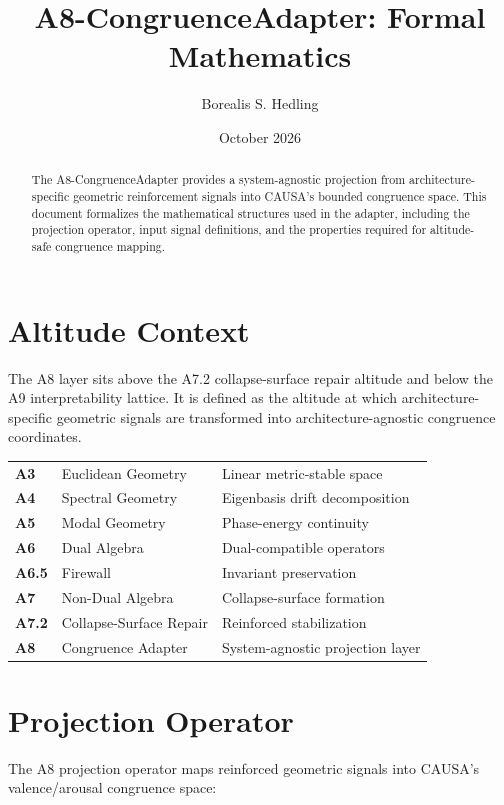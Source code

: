 \documentclass[11pt]{article}
\title{A8-CongruenceAdapter: Formal Mathematics}
\author{Borealis S. Hedling}
\date{October 2026}
\begin{document}
\maketitle

\begin{abstract}
The A8-CongruenceAdapter provides a system-agnostic projection from 
architecture-specific geometric reinforcement signals into CAUSA's bounded 
congruence space. This document formalizes the mathematical structures used 
in the adapter, including the projection operator, input signal definitions, 
and the properties required for altitude-safe congruence mapping.
\end{abstract}

\section{Altitude Context}

The A8 layer sits above the A7.2 collapse-surface repair altitude and below 
the A9 interpretability lattice. It is defined as the altitude at which 
architecture-specific geometric signals are transformed into architecture-agnostic 
congruence coordinates.

\begin{center}
\begin{tabular}{lll}
\textbf{A3} & Euclidean Geometry & Linear metric-stable space \\
\textbf{A4} & Spectral Geometry & Eigenbasis drift decomposition \\
\textbf{A5} & Modal Geometry & Phase-energy continuity \\
\textbf{A6} & Dual Algebra & Dual-compatible operators \\
\textbf{A6.5} & Firewall & Invariant preservation \\
\textbf{A7} & Non-Dual Algebra & Collapse-surface formation \\
\textbf{A7.2} & Collapse-Surface Repair & Reinforced stabilization \\
\textbf{A8} & Congruence Adapter & System-agnostic projection layer \\
\end{tabular}
\end{center}

\section{Projection Operator}

The A8 projection operator maps reinforced geometric signals into CAUSA's 
valence/arousal congruence space:
\end{document}
